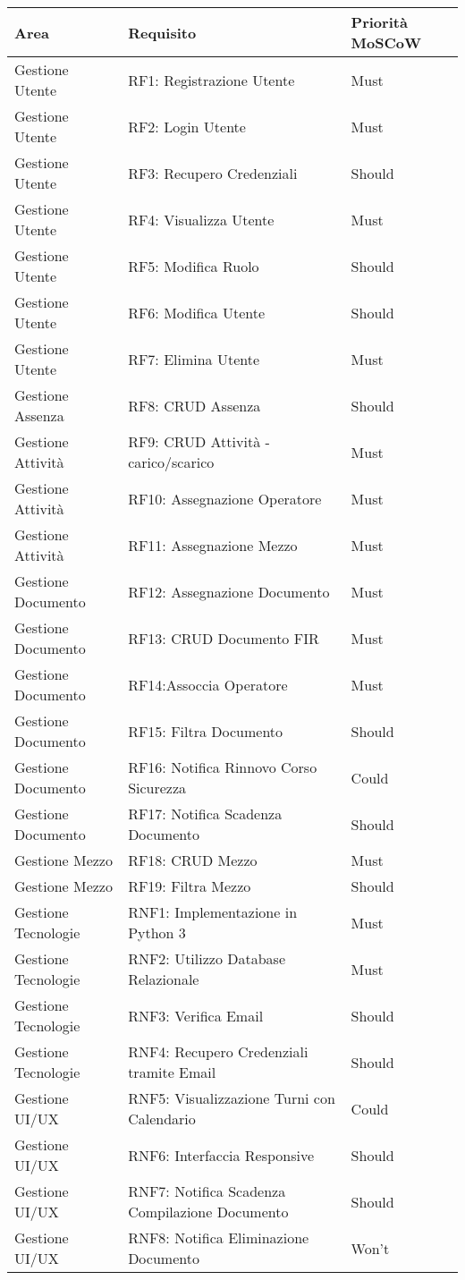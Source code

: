 \documentclass[a4paper]{report}
\begin{document}
\begin{longtable}{|p{4.5cm}|p{6.25cm}|p{2cm}|}
\hline
	\textbf{Area} & \textbf{Requisito} & \textbf{Priorità MoSCoW} \\
\hline
\endhead

Gestione Utente & RF1: Registrazione Utente & Must \\
\hline
Gestione Utente & RF2: Login Utente & Must \\
\hline
Gestione Utente & RF3: Recupero Credenziali & Should \\
\hline
Gestione Utente & RF4: Visualizza Utente & Must \\
\hline
Gestione Utente & RF5: Modifica Ruolo & Should \\
\hline
Gestione Utente & RF6: Modifica Utente & Should \\
\hline
Gestione Utente & RF7: Elimina Utente & Must \\
\hline
Gestione Assenza & RF8: CRUD Assenza & Should \\
\hline
Gestione Attività & RF9: CRUD Attività - carico/scarico & Must \\
\hline
Gestione Attività & RF10: Assegnazione Operatore & Must \\
\hline
Gestione Attività & RF11: Assegnazione Mezzo & Must \\
\hline
Gestione Documento & RF12: Assegnazione Documento & Must \\
\hline
Gestione Documento & RF13: CRUD Documento FIR & Must \\
\hline
Gestione Documento & RF14:Assoccia Operatore & Must \\
\hline
Gestione Documento & RF15: Filtra Documento & Should \\
\hline
Gestione Documento & RF16: Notifica Rinnovo Corso Sicurezza & Could \\
\hline
Gestione Documento & RF17: Notifica Scadenza Documento & Should \\
\hline
Gestione Mezzo & RF18: CRUD Mezzo & Must \\
\hline
Gestione Mezzo & RF19: Filtra Mezzo & Should \\
\hline
Gestione Tecnologie & RNF1: Implementazione in Python 3 & Must \\
\hline
Gestione Tecnologie & RNF2: Utilizzo Database Relazionale & Must \\
\hline
Gestione Tecnologie & RNF3: Verifica Email & Should \\
\hline
Gestione Tecnologie & RNF4: Recupero Credenziali tramite Email & Should \\
\hline
Gestione UI/UX & RNF5: Visualizzazione Turni con Calendario & Could \\
\hline
Gestione UI/UX & RNF6: Interfaccia Responsive & Should \\
\hline
Gestione UI/UX & RNF7: Notifica Scadenza Compilazione Documento & Should \\
\hline
Gestione UI/UX & RNF8: Notifica Eliminazione Documento & Won't \\
\hline
\end{longtable}
\end{document}
